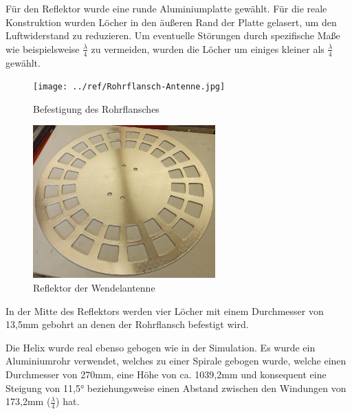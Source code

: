 Für den Reflektor wurde eine runde Aluminiumplatte gewählt. Für die reale Konstruktion wurden Löcher in den äußeren Rand der Platte gelasert, um den Luftwiderstand zu reduzieren. Um eventuelle Störungen durch spezifische Maße wie beispielsweise $\frac{\lambda}{4}$ zu vermeiden, wurden die Löcher um einiges kleiner als $\frac{\lambda}{4}$ gewählt.

\begin{figure}[H]
	\begin{minipage}[b]{.4\linewidth} %
		\texttt{[image: ../ref/Rohrflansch-Antenne.jpg]}
		\caption{Befestigung des Rohrflansches}
		\label{fig:Rohrflansch-Antenne-Verbindung}
	\end{minipage}
	\hspace{.1\linewidth}%
	\begin{minipage}[b]{.4\linewidth} %
		\includegraphics[width=7cm]{../ref/Reflektor.jpg}
		\caption{Reflektor der Wendelantenne}
		\label{fig:Reflektor}
	\end{minipage}
\end{figure}

In der Mitte des Reflektors werden vier Löcher mit einem Durchmesser von 13,5mm gebohrt an denen der Rohrflansch befestigt wird. 

Die Helix wurde real ebenso gebogen wie in der Simulation. Es wurde ein Aluminiumrohr verwendet, welches zu einer Spirale gebogen wurde, welche einen Durchmesser von 270mm, eine Höhe von ca. 1039,2mm und konsequent eine Steigung von 11,5° beziehungsweise einen Abstand zwischen den Windungen von 173,2mm ($\frac{\lambda}{4}$) hat.

